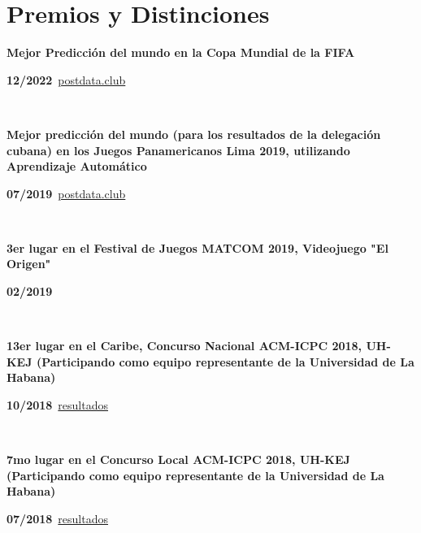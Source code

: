 \documentclass{article}
\begin{document}
\section*{Premios y Distinciones}
\begin{minipage}{0.8\textwidth}
\parbox{0.8\linewidth}{\textbf{Mejor Predicción del mundo en la Copa Mundial de la FIFA}} \hfill \textbf{12/2022}\
\href{https://www.postdata.club/suplementos/mundial-qatar/pronosticando-qatar.html}{postdata.club}
\
\end{minipage} \hfill {}\\
\begin{minipage}{0.8\textwidth}
\parbox{0.8\linewidth}{\textbf{Mejor predicción del mundo (para los resultados de la delegación cubana) en los Juegos Panamericanos Lima 2019, utilizando Aprendizaje Automático}} \hfill \textbf{07/2019}\
\href{http://www.postdata.club/issues/201907/el-medallero-de-lima-2019-que-se-puede-esperar.html}{postdata.club}
\
\end{minipage} \hfill {}\\
\begin{minipage}{0.8\textwidth}
\parbox{0.8\linewidth}{\textbf{3er lugar en el Festival de Juegos MATCOM 2019, Videojuego "El Origen"}} \hfill \textbf{02/2019}\
\
\end{minipage}\
\begin{minipage}{0.8\textwidth}
\parbox{0.8\linewidth}{\textbf{13er lugar en el Caribe, Concurso Nacional ACM-ICPC 2018, UH-KEJ (Participando como equipo representante de la Universidad de La Habana)}} \hfill \textbf{10/2018}\
\href{https://icpc.global/regionals/finder/cnc-2018/standings}{resultados}
\
\end{minipage} \hfill {}\\
\begin{minipage}{0.8\textwidth}
\parbox{0.8\linewidth}{\textbf{7mo lugar en el Concurso Local ACM-ICPC 2018, UH-KEJ (Participando como equipo representante de la Universidad de La Habana)}} \hfill \textbf{07/2018}\
\href{https://matcomgrader.com/post/5179/resultados-del-concurso-local-caribeno-2018}{resultados}
\
\end{minipage} \hfill {}\\
\end{document}
